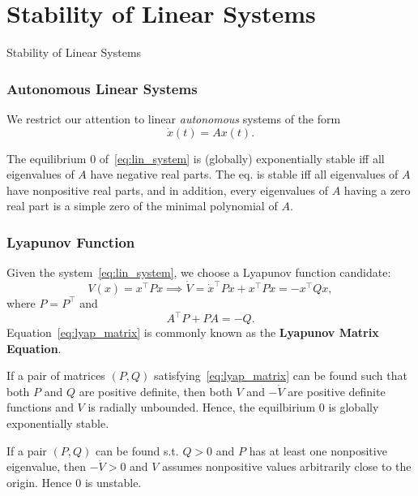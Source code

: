 \section{Stability of Linear Systems}

\begin{frame}
    Stability of Linear Systems


\end{frame}

\begingroup
\small



\begin{frame}
    \frametitle{Autonomous Linear Systems}

    We restrict our attention to linear \textit{autonomous} systems of the form 
    \begin{equation}
        \dot{x}(t) = A x(t).
        \label{eq:lin_system}
    \end{equation}

    \begin{theorem}
        The equilibrium $0$ of~\eqref{eq:lin_system} is (globally) exponentially
        stable iff all eigenvalues of $A$ have negative real parts. The eq. is
        stable iff all eigenvalues of $A$ have nonpositive real parts, and in
        addition, every eigenvalues of $A$ having a zero real part is a simple
        zero of the minimal polynomial of $A$.
    \end{theorem}
\end{frame}

\begin{frame}
    \frametitle{Lyapunov Function}

    Given the system~\eqref{eq:lin_system}, we choose a Lyapunov function
    candidate: \[ V(x) = x^\top P x \implies \dot{V} = \dot{x}^\top P x + x^\top
    P \dot{x} = - x^\top Q x, \] where $P = P^\top$ and 
    \begin{equation}
        A^\top P + PA = -Q.
        \label{eq:lyap_matrix}
    \end{equation}
    Equation~\eqref{eq:lyap_matrix} is commonly known as the \textbf{Lyapunov
    Matrix Equation}.
    \begin{rem}[Stability]
        If a pair of matrices $(P, Q)$ satisfying~\eqref{eq:lyap_matrix} can be
        found such that both $P$ and $Q$ are positive definite, then both $V$
        and $-\dot{V}$ are positive definite functions and $V$ is radially
        unbounded. Hence, the equilbirium $0$ is globally exponentially stable.

        If a pair $(P, Q)$ can be found s.t. $Q > 0$ and $P$ has at least one
        nonpositive eigenvalue, then $-\dot{V} > 0$ and $V$ assumes nonpositive
        values arbitrarily close to the origin. Hence $0$ is unstable.
    \end{rem}
\end{frame}


